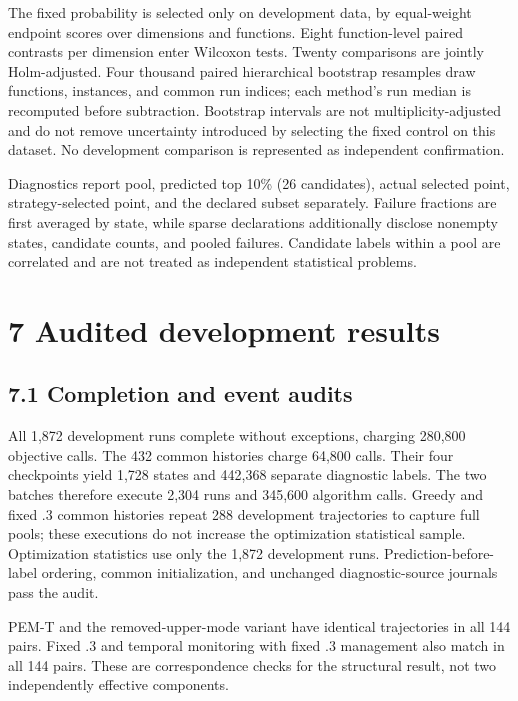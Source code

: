 \documentclass[11pt,a4paper]{article}
\begin{document}
The fixed probability is selected only on development data, by
equal-weight endpoint scores over dimensions and functions. Eight
function-level paired contrasts per dimension enter Wilcoxon tests.
Twenty comparisons are jointly Holm-adjusted. Four thousand paired
hierarchical bootstrap resamples draw functions, instances, and common
run indices; each method's run median is recomputed before subtraction.
Bootstrap intervals are not multiplicity-adjusted and do not remove
uncertainty introduced by selecting the fixed control on this dataset.
No development comparison is represented as independent confirmation.

Diagnostics report pool, predicted top 10\% (26 candidates), actual
selected point, strategy-selected point, and the declared subset
separately. Failure fractions are first averaged by state, while sparse
declarations additionally disclose nonempty states, candidate counts,
and pooled failures. Candidate labels within a pool are correlated and
are not treated as independent statistical problems.

\hypertarget{audited-development-results}{%
\section{7 Audited development
results}\label{audited-development-results}}

\hypertarget{completion-and-event-audits}{%
\subsection{7.1 Completion and event
audits}\label{completion-and-event-audits}}

All 1,872 development runs complete without exceptions, charging 280,800
objective calls. The 432 common histories charge 64,800 calls. Their
four checkpoints yield 1,728 states and 442,368 separate diagnostic
labels. The two batches therefore execute 2,304 runs and 345,600
algorithm calls. Greedy and fixed .3 common histories repeat 288
development trajectories to capture full pools; these executions do not
increase the optimization statistical sample. Optimization statistics
use only the 1,872 development runs. Prediction-before-label ordering,
common initialization, and unchanged diagnostic-source journals pass the
audit.

PEM-T and the removed-upper-mode variant have identical trajectories in
all 144 pairs. Fixed .3 and temporal monitoring with fixed .3 management
also match in all 144 pairs. These are correspondence checks for the
structural result, not two independently effective components.
\end{document}
